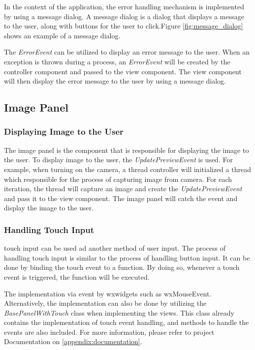 In the context of the application, the error handling mechanism is implemented by using a message dialog. A message dialog is a dialog that displays a message to the user, along with buttons for the user to click.Figure \ref{fig:message_dialog} shows an example of a message dialog.

The \textit{ErrorEvent} can be utilized to display an error message to the user. When an exception is thrown during a process, an \textit{ErrorEvent} will be created by the controller component and passed to the view component. The view component will then display the error message to the user by using a message dialog.


\subsection{Image Panel}
\label{subsec:image_panel}

\subsubsection{Displaying Image to the User}
The image panel is the component that is responsible for displaying the image to the user. To display image to the user, the \textit{UpdatePreviewEvent} is used. For example, when turning on the camera, a thread controller will initialized a thread which responsible for the process of capturing image from camera. For each iteration, the thread will capture an image and create the \textit{UpdatePreviewEvent} and pass it to the view component. The image panel will catch the event and display the image to the user.

\subsubsection{Handling Touch Input}
\label{subsubsec:handling_touch_input}
touch input can be  used ad another method of user input. The process of handling touch input is similar to the process of handling button input. It can be done by binding the touch event to a function. By doing so, whenever a touch event is triggered, the function will be executed.

The implementation via event by wxwidgets such as wxMouseEvent. Alternatively, the implementation can also be done by utilizing the \textit{BasePanelWithTouch} class when implementing the views. This class already contains the implementation of touch event handling, and  methods to handle the events are also included. For more information, please refer to project Documentation on \ref{appendix:documentation}.

